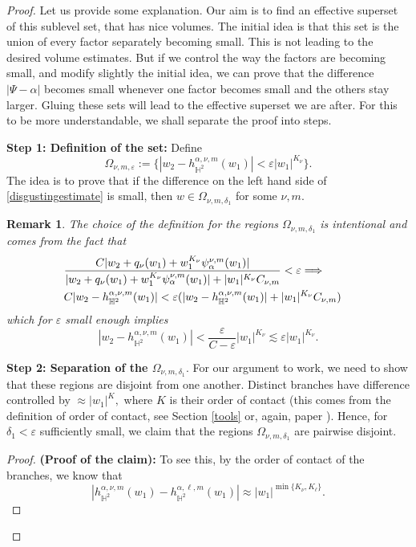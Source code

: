 \documentclass[12pt]{amsart}
\newtheorem{remark}[theorem]{Remark}
\numberwithin{equation}{section}
\begin{document}
\begin{proof}
Let us provide some explanation. Our aim is to find an effective superset of this sublevel set, that has nice volumes. The initial idea is that this set is the union of every factor separately becoming small. This is not leading to the desired volume estimates. But if we control the way the factors are becoming small, and modify slightly the initial idea, we can prove that the difference $|\Psi-\alpha|$ becomes small whenever one factor becomes small and the others stay larger. Gluing these sets will lead to the effective superset we are after. For this to be more understandable, we shall separate the proof into steps.

\textbf{Step 1: Definition of the set:}
Define
$$\Omega_{\nu,m,\varepsilon}:=\{|w_2-h^{\alpha,\nu,m}_{\mathbb{H}^2}(w_1)|<\varepsilon|w_1|^{K_\nu}\}.$$
The idea is to prove that if the difference on the left hand side of \ref{disgustingestimate} is small, then $w\in \Omega_{\nu,m,\delta_1}$ for some $\nu,m.$  
 \begin{remark}
The choice of the definition for the regions $\Omega_{\nu,m,\delta_1}$ is intentional and comes from the fact that
\begin{align}
&\frac{C|w_2+q_\nu(w_1)+w_1^{K_{\nu}}\psi^{\nu,m}_{\alpha}(w_1)|}{|w_2+q_\nu(w_1)+w_1^{K_\nu}\psi_{\alpha}^{\nu,m}(w_1)|+|w_1|^{K_\nu}C_{\nu,m}}<\varepsilon\Longrightarrow\notag&&\\ & C|w_2-h^{\alpha,\nu,m}_{\mathbb{H}^2}(w_1)|<\varepsilon(|w_2-h^{\alpha,\nu,m}_{\mathbb{H}^2}(w_1)|+|w_1|^{K_{\nu}}C_{\nu,m})\notag
\end{align}
which for $\varepsilon$ small enough implies $$|w_2-h^{\alpha,\nu,m}_{\mathbb{H}^2}(w_1)|<\frac{\varepsilon}{C-\varepsilon}|w_1|^{K_\nu}\lesssim\varepsilon|w_1|^{K_{\nu}}.$$
\end{remark}
\textbf{Step 2: Separation of the $\Omega_{\nu,m,\delta_1}.$}
For our argument to work, we need to show that these regions are disjoint from one another. Distinct branches have difference controlled by $\approx|w_1|^{K},$ where $K$ is their order of contact (this comes from the definition of order of contact, see Section \ref{tools} or, again, paper \cite{Clark}).  Hence, for
 $\delta_1<\varepsilon$ sufficiently small, we claim that the regions $\Omega_{\nu,m,\delta_1}$
   are pairwise disjoint.
   \begin{proof} \textbf{(Proof of the claim):}
   To see this, by the order of contact of the branches, we know that $$|h^{\alpha,\nu,m}_{\mathbb{H}^2}(w_1)-h^{\alpha,\ell,m}_{\mathbb{H}^2}(w_1)|\approx |w_1|^{\min\{K_\nu,K_\ell\}}.$$

\end{proof}
\end{proof}
\end{document}
